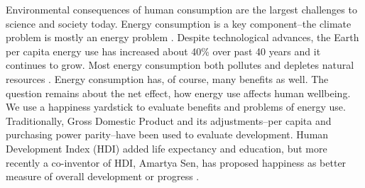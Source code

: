 \documentclass[10pt, letterpaper]{article}
\begin{document}
\vspace{.15in} 

\begin{spacing}{1.4}




Environmental consequences of human consumption are the largest challenges to
science and society today. Energy consumption is a key component--the climate problem is mostly an energy problem \cite{mackay08}. Despite
technological advances, the Earth per capita energy use has increased about 40\%
over past 40 years and it continues to grow. %
Most energy consumption both pollutes and  depletes natural resources
\cite{arrow04, soytas07}. %
 Energy consumption has, of course, many benefits as well.
 The question remains about the net effect, how energy use affects human wellbeing.
We use a happiness yardstick
to evaluate benefits and problems of energy use. Traditionally, Gross Domestic
Product and its adjustments--per capita and purchasing power parity--have been used to evaluate development. Human Development Index (HDI)
added life expectancy and education, but more recently a co-inventor of HDI,
Amartya Sen, has proposed happiness as better measure of overall development or
progress 
\cite{stiglitz09al}. 


\end{spacing}
\end{document}
